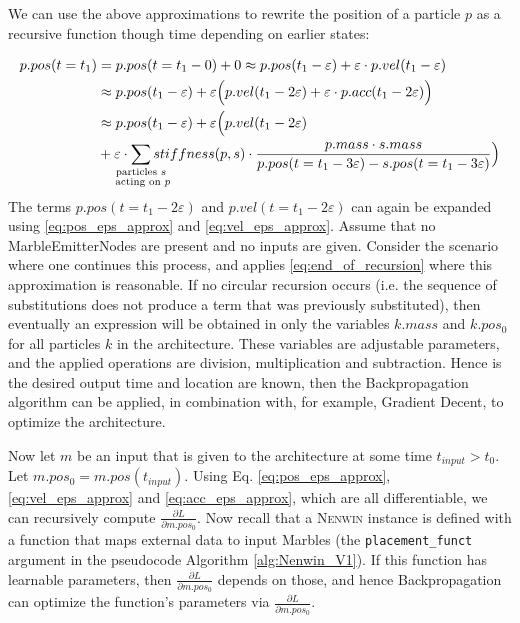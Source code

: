 We can use the above approximations to rewrite the position of a particle $p$ as a recursive function though time depending on earlier states:

\begin{align}
    p.pos(t = t_1)  &= p.pos(t = t_1 - 0) + 0 
                    \approx p.pos(t_1 - \varepsilon) + \varepsilon \cdot p.vel(t_1 - \varepsilon) \nonumber \\
                    &\approx p.pos(t_1 - \varepsilon) + \varepsilon \Big(  p.vel(t_1 - 2\varepsilon) + \varepsilon \cdot p.acc(t_1 - 2\varepsilon) \Big)\nonumber \\
                    &\approx p.pos(t_1 - \varepsilon) + \varepsilon \Big(  p.vel(t_1 - 2\varepsilon) \nonumber \\ &+ \varepsilon \cdot \smashoperator{\sum_{\substack{\text{particles $s$}\\\text{ acting on $p$}}}}stiffness(p, s)\cdot\frac{p.mass \cdot s.mass}{p.pos(t=t_1 -3\varepsilon)-s.pos(t=t_1 -3\varepsilon)} \Big) \label{eq:pos_recursive}
\end{align}
The terms $p.pos(t=t_1 - 2\varepsilon)$ and $p.vel(t = t_1 - 2\varepsilon)$ can again be expanded using \eqref{eq:pos_eps_approx} and \eqref{eq:vel_eps_approx}. Assume that no MarbleEmitterNodes are present and no inputs are given. Consider the scenario where one continues this process, and applies \eqref{eq:end_of_recursion} where this approximation is reasonable. If no circular recursion occurs (i.e. the sequence of substitutions does not produce a term that was previously substituted), then eventually an expression will be obtained in only the variables $k.mass$ and $k.pos_0$ for all particles $k$ in the architecture. These variables are adjustable parameters, and the applied operations are division, multiplication and subtraction. Hence is the desired output time and location are known, then the Backpropagation algorithm can be applied, in combination with, for example, Gradient Decent, to optimize the architecture.

Now let $m$ be an input that is given to the architecture at some time $t_{input} > t_0$. Let $m.pos_0 = m.pos(t_{input})$. Using Eq. \eqref{eq:pos_eps_approx}, \eqref{eq:vel_eps_approx} and \eqref{eq:acc_eps_approx}, which are all differentiable, we can recursively compute $\frac{\partial L}{\partial m.pos_0}$. Now recall that a \textsc{Nenwin} instance is defined with a function that maps external data to input Marbles (the \texttt{placement\_funct} argument in the pseudocode Algorithm \ref{alg:Nenwin_V1}). If this function has learnable parameters, then $\frac{\partial L}{\partial m.pos_0}$ depends on those, and hence Backpropagation can optimize the function's parameters via $\frac{\partial L}{\partial m.pos_0}$.

